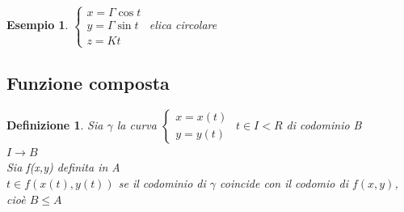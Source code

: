 \documentclass{book}
\newtheorem{defi}{Definizione}
\newtheorem{esempio}{Esempio}
\begin{document}
\begin{esempio}
  $\begin{cases} x = \Gamma \cos t \\ y = \Gamma \sin t \\ z=Kt \end{cases}$ elica circolare 
\end{esempio}
\subsection{Funzione composta}
\begin{defi}
  Sia $\gamma$ la curva $\begin{cases} x=x(t) \\ y=y(t)\end{cases}$ $t\in I < R$
	di codominio B\\
  $I\to B$\\
  Sia f(x,y) definita in A \\
  $t\in f(x(t),y(t))$ se il codominio di $\gamma$ coincide con il codomio di
	$f(x,y)$, cioè
  $B \leq A$
\end{defi}
\end{document}
